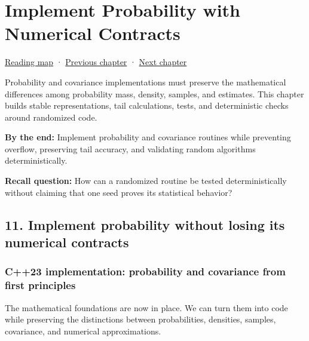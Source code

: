 \chapter{Implement Probability with Numerical Contracts}\label{02-foundations-ii-ch031-implement-probability-with-numerical-contracts}\hypertarget{02-foundations-ii-ch031}{}\label{stagechapter:02-foundations-ii-ch031}

\hypertarget{02-foundations-ii-ch031-implement-probability-with-numerical-contracts}{}

\hyperref[volume-reading-map]{Reading map} · \hyperref[02-foundations-ii-ch030-monte-carlo-estimates-and-uncertainty-metrics]{Previous chapter} · \hyperref[03-visual-computing-i-ch012]{Next chapter}

Probability and covariance implementations must preserve the mathematical differences among probability mass, density, samples, and estimates. This chapter builds stable representations, tail calculations, tests, and deterministic checks around randomized code.

\textbf{By the end:} Implement probability and covariance routines while preventing overflow, preserving tail accuracy, and validating random algorithms deterministically.

\textbf{Recall question:} How can a randomized routine be tested deterministically without claiming that one seed proves its statistical behavior?

\section{11. Implement probability without losing its numerical contracts}\label{02-foundations-ii-ch031-implement-probability-without-losing-its-numerical-contracts}

\hypertarget{02-foundations-ii-ch031-implement-probability-without-losing-its-numerical-contracts}{}

\subsection{C++23 implementation: probability and covariance from first principles}\label{02-foundations-ii-ch031-c23-implementation-probability-and-covariance-from-first-principles}

\hypertarget{02-foundations-ii-ch031-c23-implementation-probability-and-covariance-from-first-principles}{}

The mathematical foundations are now in place. We can turn them into code while preserving the distinctions between probabilities, densities, samples, covariance, and numerical approximations.

